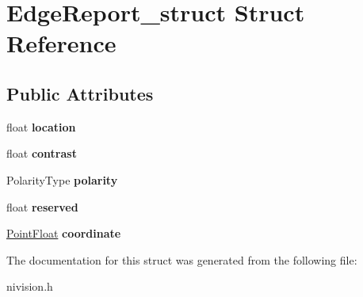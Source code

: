 \hypertarget{structEdgeReport__struct}{
\section{EdgeReport\_\-struct Struct Reference}
\label{structEdgeReport__struct}
}
\subsection*{Public Attributes}
\begin{DoxyCompactItemize}
\item 
\hypertarget{structEdgeReport__struct_a5b52258eeec6af14a1f53caeb79f009d}{
float {\bfseries location}}
\label{structEdgeReport__struct_a5b52258eeec6af14a1f53caeb79f009d}

\item 
\hypertarget{structEdgeReport__struct_a571a11c51709d09a0a10c55cc5240ff4}{
float {\bfseries contrast}}
\label{structEdgeReport__struct_a571a11c51709d09a0a10c55cc5240ff4}

\item 
\hypertarget{structEdgeReport__struct_a561439f8fc889388f32d148d97cdbffa}{
PolarityType {\bfseries polarity}}
\label{structEdgeReport__struct_a561439f8fc889388f32d148d97cdbffa}

\item 
\hypertarget{structEdgeReport__struct_a9221def94e693eac4cbfd4c76ace93b8}{
float {\bfseries reserved}}
\label{structEdgeReport__struct_a9221def94e693eac4cbfd4c76ace93b8}

\item 
\hypertarget{structEdgeReport__struct_a4661a2cc3dbad7b73a0f4d8927e4757a}{
\hyperlink{structPointFloat__struct}{PointFloat} {\bfseries coordinate}}
\label{structEdgeReport__struct_a4661a2cc3dbad7b73a0f4d8927e4757a}

\end{DoxyCompactItemize}


The documentation for this struct was generated from the following file:\begin{DoxyCompactItemize}
\item 
nivision.h\end{DoxyCompactItemize}
